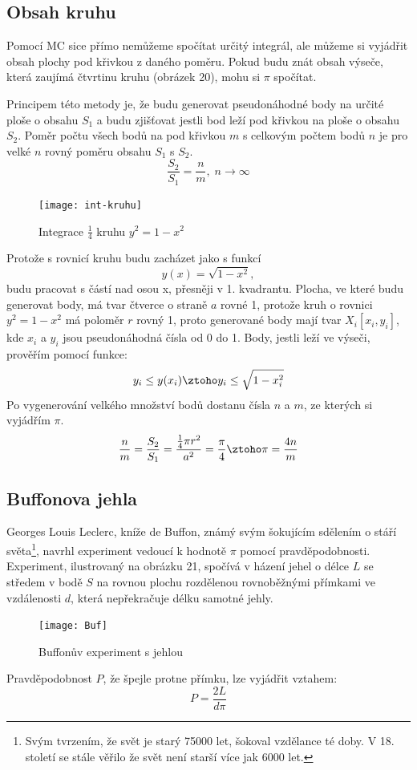 \documentclass[rocnikovka]{gzwroc} %
\begin{document}
\subsection{Obsah kruhu}
Pomocí MC sice přímo nemůžeme spočítat určitý integrál, ale můžeme si vyjádřit obsah plochy pod křivkou z daného poměru. Pokud budu znát obsah výseče, která zaujímá čtvrtinu kruhu (obrázek 20), mohu si $\pi$ spočítat.

Principem této metody je, že budu generovat pseudonáhodné body na určité ploše o obsahu $S_1$ a budu zjišťovat jestli bod leží pod křivkou na ploše o obsahu $S_2$. Poměr počtu všech bodů na pod křivkou $m$ s celkovým počtem bodů $n$ je pro velké $n$ rovný poměru obsahu $S_1$ s $S_2$.
\begin{equation}
\frac{S_2}{S_1}=\frac{n}{m}, \; n\rightarrow\infty
\end{equation}
\begin{figure}[!ht]
\texttt{[image: int-kruhu]}
\caption{Integrace $\frac{1}{4}$ kruhu $y^2={1-x^2}$}
\label{fig:kruh}
\end{figure}
Protože s rovnicí kruhu budu zacházet jako s funkcí $$y(x)=\sqrt{1-x^2},$$ budu pracovat s částí nad osou x, přesněji v 1. kvadrantu. Plocha, ve které budu generovat body, má tvar čtverce o straně $a$ rovné 1, protože kruh o rovnici $y^2={1-x^2}$ má poloměr $r$ rovný 1, proto generované body mají tvar $X_i[x_i, y_i]$, kde $x_i$ a $y_i$ jsou pseudonáhodná čísla od 0 do 1. Body, jestli leží ve výseči, prověřím pomocí funkce:
$$
y_i\leq y(x_i) \ztoho y_i \leq\sqrt{1-x_i^2}
$$
Po vygenerování velkého množství bodů dostanu čísla $n$ a $m$, ze kterých si vyjádřím $\pi$.
\begin{equation}
\frac{n}{m}=\frac{S_2}{S_1}=\frac{\frac{1}{4}\pi r^2}{a^2}=\frac{\pi}{4} \ztoho \pi=\frac{4n}{m}
\end{equation}

\subsection{Buffonova jehla}
Georges Louis Leclerc, kníže de Buffon, známý svým šokujícím sdělením o stáří světa\footnote[5]{Svým tvrzením, že svět je starý 75000 let, šokoval vzdělance té doby. V 18. století se stále věřilo že svět není starší více jak 6000 let.}, navrhl experiment vedoucí k hodnotě $\pi$ pomocí pravděpodobnosti. Experiment, ilustrovaný na obrázku 21, spočívá v házení jehel o délce $L$ se středem v bodě $S$ na rovnou plochu rozdělenou rovnoběžnými přímkami ve vzdálenosti $d$, která nepřekračuje délku samotné jehly.
\begin{figure}[!ht]
\texttt{[image: Buf]}
\caption{Buffonův experiment s jehlou}
\label{fig:kruh}
\end{figure}
Pravděpodobnost $P$, že špejle protne přímku, lze vyjádřit vztahem:
\begin{equation}
P=\frac{2L}{d\pi}
\end{equation}
\end{document}
